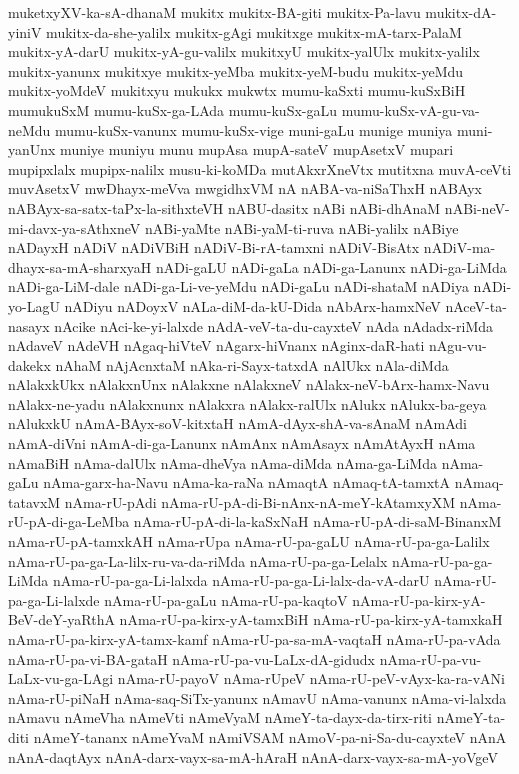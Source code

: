 {muketxyXV-ka-sA-dhanaM
mukitx
mukitx-BA-giti
mukitx-Pa-lavu
mukitx-dA-yiniV
mukitx-da-she-yalilx
mukitx-gAgi
mukitxge
mukitx-mA-tarx-PalaM
mukitx-yA-darU
mukitx-yA-gu-valilx
mukitxyU
mukitx-yalUlx
mukitx-yalilx
mukitx-yanunx
mukitxye
mukitx-yeMba
mukitx-yeM-budu
mukitx-yeMdu
mukitx-yoMdeV
mukitxyu
mukukx
mukwtx
mumu-kaSxti
mumu-kuSxBiH
mumukuSxM
mumu-kuSx-ga-LAda
mumu-kuSx-gaLu
mumu-kuSx-vA-gu-va-neMdu
mumu-kuSx-vanunx
mumu-kuSx-vige
muni-gaLu
munige
muniya
muni-yanUnx
muniye
muniyu
munu
mupAsa
mupA-sateV
mupAsetxV
mupari
mupipxlalx
mupipx-nalilx
musu-ki-koMDa
mutAkxrXneVtx
mutitxna
muvA-ceVti
muvAsetxV
mwDhayx-meVva
mwgidhxVM
nA
nABA-va-niSaThxH
nABAyx
nABAyx-sa-satx-taPx-la-sithxteVH
nABU-dasitx
nABi
nABi-dhAnaM
nABi-neV-mi-davx-ya-sAthxneV
nABi-yaMte
nABi-yaM-ti-ruva
nABi-yalilx
nABiye
nADayxH
nADiV
nADiVBiH
nADiV-Bi-rA-tamxni
nADiV-BisAtx
nADiV-ma-dhayx-sa-mA-sharxyaH
nADi-gaLU
nADi-gaLa
nADi-ga-Lanunx
nADi-ga-LiMda
nADi-ga-LiM-dale
nADi-ga-Li-ve-yeMdu
nADi-gaLu
nADi-shataM
nADiya
nADi-yo-LagU
nADiyu
nADoyxV
nALa-diM-da-kU-Dida
nAbArx-hamxNeV
nAceV-ta-nasayx
nAcike
nAci-ke-yi-lalxde
nAdA-veV-ta-du-cayxteV
nAda
nAdadx-riMda
nAdaveV
nAdeVH
nAgaq-hiVteV
nAgarx-hiVnanx
nAginx-daR-hati
nAgu-vu-dakekx
nAhaM
nAjAcnxtaM
nAka-ri-Sayx-tatxdA
nAlUkx
nAla-diMda
nAlakxkUkx
nAlakxnUnx
nAlakxne
nAlakxneV
nAlakx-neV-bArx-hamx-Navu
nAlakx-ne-yadu
nAlakxnunx
nAlakxra
nAlakx-ralUlx
nAlukx
nAlukx-ba-geya
nAlukxkU
nAmA-BAyx-soV-kitxtaH
nAmA-dAyx-shA-va-sAnaM
nAmAdi
nAmA-diVni
nAmA-di-ga-Lanunx
nAmAnx
nAmAsayx
nAmAtAyxH
nAma
nAmaBiH
nAma-dalUlx
nAma-dheVya
nAma-diMda
nAma-ga-LiMda
nAma-gaLu
nAma-garx-ha-Navu
nAma-ka-raNa
nAmaqtA
nAmaq-tA-tamxtA
nAmaq-tatavxM
nAma-rU-pAdi
nAma-rU-pA-di-Bi-nAnx-nA-meY-kAtamxyXM
nAma-rU-pA-di-ga-LeMba
nAma-rU-pA-di-la-kaSxNaH
nAma-rU-pA-di-saM-BinanxM
nAma-rU-pA-tamxkAH
nAma-rUpa
nAma-rU-pa-gaLU
nAma-rU-pa-ga-Lalilx
nAma-rU-pa-ga-La-lilx-ru-va-da-riMda
nAma-rU-pa-ga-Lelalx
nAma-rU-pa-ga-LiMda
nAma-rU-pa-ga-Li-lalxda
nAma-rU-pa-ga-Li-lalx-da-vA-darU
nAma-rU-pa-ga-Li-lalxde
nAma-rU-pa-gaLu
nAma-rU-pa-kaqtoV
nAma-rU-pa-kirx-yA-BeV-deY-yaRthA
nAma-rU-pa-kirx-yA-tamxBiH
nAma-rU-pa-kirx-yA-tamxkaH
nAma-rU-pa-kirx-yA-tamx-kamf
nAma-rU-pa-sa-mA-vaqtaH
nAma-rU-pa-vAda
nAma-rU-pa-vi-BA-gataH
nAma-rU-pa-vu-LaLx-dA-gidudx
nAma-rU-pa-vu-LaLx-vu-ga-LAgi
nAma-rU-payoV
nAma-rUpeV
nAma-rU-peV-vAyx-ka-ra-vANi
nAma-rU-piNaH
nAma-saq-SiTx-yanunx
nAmavU
nAma-vanunx
nAma-vi-lalxda
nAmavu
nAmeVha
nAmeVti
nAmeVyaM
nAmeY-ta-dayx-da-tirx-riti
nAmeY-ta-diti
nAmeY-tananx
nAmeYvaM
nAmiVSAM
nAmoV-pa-ni-Sa-du-cayxteV
nAnA
nAnA-daqtAyx
nAnA-darx-vayx-sa-mA-hAraH
nAnA-darx-vayx-sa-mA-yoVgeV
}
